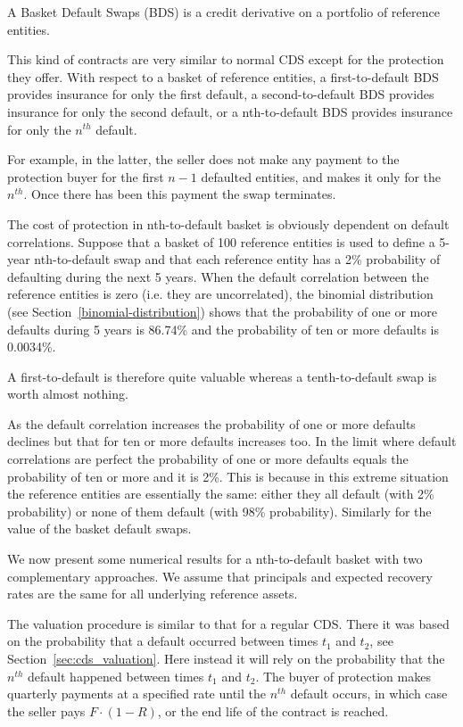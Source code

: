 A Basket Default Swaps (BDS) is a credit derivative on a portfolio of reference entities.

This kind of contracts are very similar to normal CDS except for the protection they offer. With respect to a basket of reference entities, a first-to-default BDS provides insurance for only the first default, a second-to-default BDS provides insurance for only the second default, or a nth-to-default BDS provides insurance for only the $n^{th}$ default. 

For example, in the latter, the seller does not make any payment to the protection buyer for the first $n-1$ defaulted entities, and makes it only for the $n^{th}$. Once there has been this payment the swap terminates.

The cost of protection in nth-to-default basket is obviously dependent on default correlations. Suppose that a basket of 100 reference entities is used to define a 5-year nth-to-default swap and that each reference entity has a 2\% probability of defaulting during the next 5 years. When the default correlation between the reference entities is zero (i.e. they are uncorrelated), the binomial distribution (see Section~\ref{binomial-distribution}) shows that the probability of one or more defaults during 5 years is 86.74\% and the probability of ten or more defaults is 0.0034\%.

A first-to-default is therefore quite valuable whereas a tenth-to-default swap is worth almost nothing.

As the default correlation increases the probability of one or more defaults declines but that for ten or more defaults increases too. In the limit where default correlations are perfect the probability of one or more defaults equals the probability of ten or more and it is 2\%. This is because in this extreme situation the reference entities are essentially the same: either they all default (with 2\% probability) or none of them default (with 98\% probability). Similarly for the value of the basket default swaps.

We now present some numerical results for a nth-to-default basket with two complementary approaches. We assume that principals and expected recovery rates are the same for all underlying reference assets. 

The valuation procedure is similar to that for a regular CDS. There it was based on the probability that a default occurred between times $t_1$ and $t_2$, see Section~\ref{sec:cds_valuation}. Here instead it will rely on the probability that the $n^{th}$ default happened between times $t_1$ and $t_2$. The buyer of protection makes quarterly payments at a specified rate until the $n^{th}$ default occurs, in which case the seller pays $F\cdot(1-R)$, or the end life of the contract is reached. 

